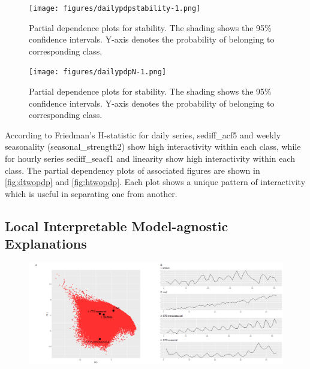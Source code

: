 \documentclass[11pt,a4paper,]{article}
\begin{document}
\begin{figure}
\centering
\texttt{[image: figures/dailypdpstability-1.png]}
\caption{\label{fig:dailypdpstability}Partial dependence plots for
stability. The shading shows the 95\% confidence intervals. Y-axis
denotes the probability of belonging to corresponding class.}
\end{figure}

\begin{figure}
\centering
\texttt{[image: figures/dailypdpN-1.png]}
\caption{\label{fig:dailypdpN}Partial dependence plots for stability. The
shading shows the 95\% confidence intervals. Y-axis denotes the
probability of belonging to corresponding class.}
\end{figure}

According to Friedman's H-statistic for daily series, sediff\_acf5 and
weekly seasonality (seasonal\_strength2) show high interactivity within
each class, while for hourly series sediff\_seacf1 and linearity show
high interactivity within each class. The partial dependency plots of
associated figures are shown in \autoref{fig:dtwopdp} and
\autoref{fig:htwopdp}. Each plot shows a unique pattern of interactivity
which is useful in separating one from another.

\clearpage

\subsection{Local Interpretable Model-agnostic
Explanations}\label{local-interpretable-model-agnostic-explanations}

\begin{figure}[h]

{\centering \includegraphics{figures/quarterlylime-1} 

}

\end{figure}
\end{document}
